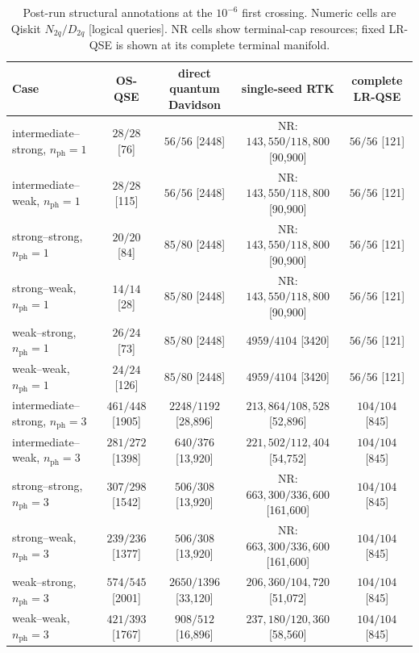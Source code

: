 \documentclass[
  reprint,
  amsmath,
  amssymb,
  aps,
  pra,
  nofootinbib,
  superscriptaddress,
  floatfix
]{revtex4-2}
\newcommand{\nph}{n_{\mathrm{ph}}}
\begin{document}
\begin{table}[t]
\caption{Post-run structural annotations at the
$10^{-6}$ first crossing.  Numeric cells are Qiskit $N_{2q}/D_{2q}$
[logical queries].  NR cells show terminal-cap resources; fixed LR-QSE is
shown at its complete terminal manifold.}
\label{tab:qiskit_1em6}
\begin{center}
\scriptsize
\begin{tabular*}{\textwidth}{@{\extracolsep{\fill}}lcccc@{}}
\toprule
Case & OS-QSE & direct quantum Davidson & single-seed RTK & complete LR-QSE \\
\midrule
intermediate--strong, $\nph=1$ & $28/28$ [76] & $56/56$ [2448] & NR: $143{,}550/118{,}800$ [90,900] & $56/56$ [121] \\
intermediate--weak, $\nph=1$ & $28/28$ [115] & $56/56$ [2448] & NR: $143{,}550/118{,}800$ [90,900] & $56/56$ [121] \\
strong--strong, $\nph=1$ & $20/20$ [84] & $85/80$ [2448] & NR: $143{,}550/118{,}800$ [90,900] & $56/56$ [121] \\
strong--weak, $\nph=1$ & $14/14$ [28] & $85/80$ [2448] & NR: $143{,}550/118{,}800$ [90,900] & $56/56$ [121] \\
weak--strong, $\nph=1$ & $26/24$ [73] & $85/80$ [2448] & $4959/4104$ [3420] & $56/56$ [121] \\
weak--weak, $\nph=1$ & $24/24$ [126] & $85/80$ [2448] & $4959/4104$ [3420] & $56/56$ [121] \\
intermediate--strong, $\nph=3$ & $461/448$ [1905] & $2248/1192$ [28,896] & $213{,}864/108{,}528$ [52,896] & $104/104$ [845] \\
intermediate--weak, $\nph=3$ & $281/272$ [1398] & $640/376$ [13,920] & $221{,}502/112{,}404$ [54,752] & $104/104$ [845] \\
strong--strong, $\nph=3$ & $307/298$ [1542] & $506/308$ [13,920] & NR: $663{,}300/336{,}600$ [161,600] & $104/104$ [845] \\
strong--weak, $\nph=3$ & $239/236$ [1377] & $506/308$ [13,920] & NR: $663{,}300/336{,}600$ [161,600] & $104/104$ [845] \\
weak--strong, $\nph=3$ & $574/545$ [2001] & $2650/1396$ [33,120] & $206{,}360/104{,}720$ [51,072] & $104/104$ [845] \\
weak--weak, $\nph=3$ & $421/393$ [1767] & $908/512$ [16,896] & $237{,}180/120{,}360$ [58,560] & $104/104$ [845] \\
\bottomrule
\end{tabular*}
\end{center}
\end{table}
\end{document}
